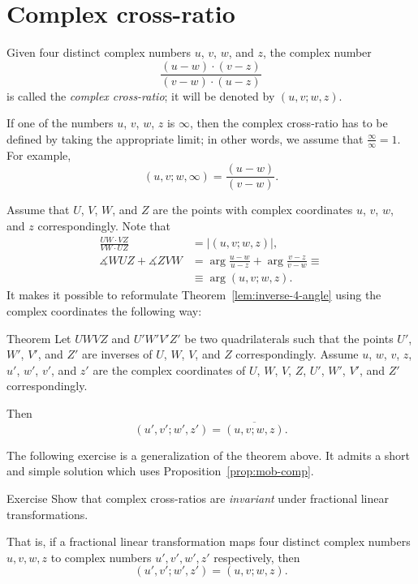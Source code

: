 \section*{Complex cross-ratio}

Given four distinct complex numbers $u$, $v$, $w$, and $z$,
the complex number
$$
\frac{(u-w)\cdot(v-z)}{(v-w)\cdot(u-z)}$$
is called the \emph{complex cross-ratio}; 
it will be denoted by $(u,v;w,z)$.

If one of the numbers $u$, $v$, $w$, $z$ is $\infty$, 
then the complex cross-ratio has to be defined by taking the appropriate limit; in other words, we assume that $\frac\infty\infty=1$.
For example,
$$(u, v; w, \infty)=\frac{(u-w)}{(v-w)}.$$

Assume that $U$, $V$, $W$, and  $Z$ are the points with complex coordinates  
$u$, $v$, $w$, and $z$ correspondingly.
Note that 
\begin{align*}
\frac{UW\cdot VZ}{VW\cdot UZ}&=|(u,v;w,z)|,
\\
\measuredangle WUZ +\measuredangle ZVW&=\arg\frac{u-w}{u-z}+\arg\frac{v-z}{v-w}\equiv 
\\
&\equiv \arg(u,v;w,z).
\end{align*}
It makes it possible to reformulate Theorem~\ref{lem:inverse-4-angle} using the complex coordinates
the following way:

\begin{thm}{Theorem}\label{lem:inverse-4-angle-C}
Let $UWVZ$ and $U'W'V'Z'$  be two quadrilaterals 
such that the points $U'$, $W'$, $V'$, and $Z'$ are inverses of $U$, $W$, $V$, and $Z$ correspondingly.
Assume $u$, $w$, $v$, $z$, $u'$, $w'$, $v'$, and $z'$ are the complex coordinates of $U$, $W$, $V$, $Z$, $U'$, $W'$, $V'$, and $Z'$ correspondingly.

Then 
$$(u',v';w',z')=\overline{(u,v;w,z)}.$$

\end{thm}

The following exercise is a generalization of the theorem above.
It admits a short and simple solution which uses Proposition~\ref{prop:mob-comp}.

\begin{thm}{Exercise}\label{ex:C-cross-ratio}
Show that 
complex cross-ratios are {}\emph{invariant} under fractional linear transformations. 

That is, if a fractional linear transformation maps four distinct complex numbers $u, v, w, z$ to complex numbers $u', v', w', z'$ respectively, then
$$
(u',v';w',z')
=
(u,v;w,z).
$$

\end{thm}

